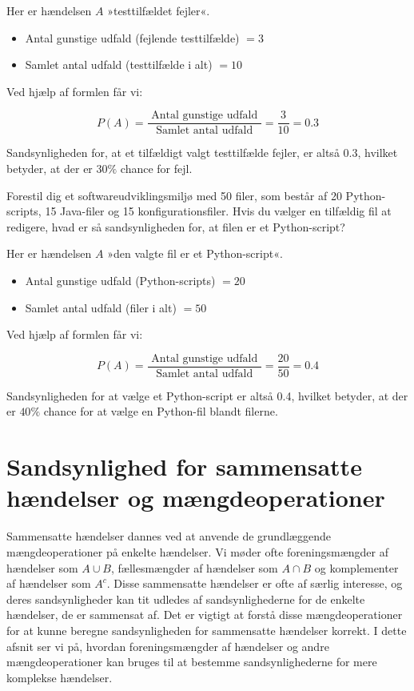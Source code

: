 \begin{solution}
    Her er hændelsen $A$ »testtilfældet fejler«.
\begin{itemize}
    \item Antal gunstige udfald (fejlende testtilfælde) $=3$
    \item Samlet antal udfald (testtilfælde i alt) $=10$
\end{itemize}

Ved hjælp af formlen får vi:

$$
P(A)=\frac{\text { Antal gunstige udfald }}{\text { Samlet antal udfald }}=\frac{3}{10}=0.3
$$


Sandsynligheden for, at et tilfældigt valgt testtilfælde fejler, er altså 0.3, hvilket betyder, at der er $30 \%$ chance for fejl.

\end{solution}

\begin{example}
    Forestil dig et softwareudviklingsmiljø med 50 filer, som består af 20 Python-scripts, 15 Java-filer og 15 konfigurationsfiler. Hvis du vælger en tilfældig fil at redigere, hvad er så sandsynligheden for, at filen er et Python-script?
\end{example}

\begin{solution}
Her er hændelsen $A$ »den valgte fil er et Python-script«.
\begin{itemize}
    \item Antal gunstige udfald (Python-scripts) $=20$
    \item Samlet antal udfald (filer i alt) $=50$
\end{itemize}

Ved hjælp af formlen får vi:

$$
P(A)=\frac{\text { Antal gunstige udfald }}{\text { Samlet antal udfald }}=\frac{20}{50}=0.4
$$

Sandsynligheden for at vælge et Python-script er altså 0.4, hvilket betyder, at der er $40 \%$ chance for at vælge en Python-fil blandt filerne.

\end{solution}

\section{Sandsynlighed for sammensatte hændelser og mængdeoperationer}
Sammensatte hændelser dannes ved at anvende de grundlæggende mængdeoperationer på enkelte hændelser. Vi møder ofte foreningsmængder af hændelser som $A \cup B$, fællesmængder af hændelser som $A \cap B$ og komplementer af hændelser som $A^c$. Disse sammensatte hændelser er ofte af særlig interesse, og deres sandsynligheder kan tit udledes af sandsynlighederne for de enkelte hændelser, de er sammensat af. Det er vigtigt at forstå disse mængdeoperationer for at kunne beregne sandsynligheden for sammensatte hændelser korrekt. I dette afsnit ser vi på, hvordan foreningsmængder af hændelser og andre mængdeoperationer kan bruges til at bestemme sandsynlighederne for mere komplekse hændelser.

